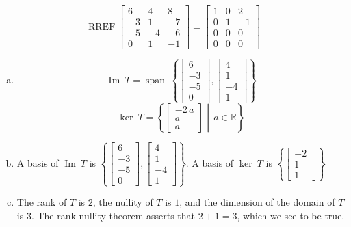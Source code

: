 \begin{exerciseAnswer} 


\[\operatorname{RREF} \left[\begin{array}{ccc}
6 & 4 & 8 \\
-3 & 1 & -7 \\
-5 & -4 & -6 \\
0 & 1 & -1
\end{array}\right] = \left[\begin{array}{ccc}
1 & 0 & 2 \\
0 & 1 & -1 \\
0 & 0 & 0 \\
0 & 0 & 0
\end{array}\right] \]


\begin{enumerate}[(a)]
\item \[\operatorname{Im}\ T = \operatorname{span}\  \left\{ \left[\begin{array}{c}
6 \\
-3 \\
-5 \\
0
\end{array}\right] , \left[\begin{array}{c}
4 \\
1 \\
-4 \\
1
\end{array}\right] \right\} \]\[\operatorname{ker}\ T =  \left\{ \left[\begin{array}{c}
-2 \, a \\
a \\
a
\end{array}\right] \middle|\,a\in\mathbb{R}\right\} \]
\item  A basis of \(\operatorname{Im}\ T\) is \( \left\{ \left[\begin{array}{c}
6 \\
-3 \\
-5 \\
0
\end{array}\right] , \left[\begin{array}{c}
4 \\
1 \\
-4 \\
1
\end{array}\right] \right\} \). A basis of \(\operatorname{ker}\ T\) is \( \left\{ \left[\begin{array}{c}
-2 \\
1 \\
1
\end{array}\right] \right\} \)
\item  The rank of \(T\) is \( 2 \), the nullity of \(T\) is \( 1 \), and the dimension of the domain of \(T\) is \( 3 \). The rank-nullity theorem asserts that \( 2 + 1 = 3 \), which we see to be true. 
\end{enumerate}
    
\end{exerciseAnswer}
    
